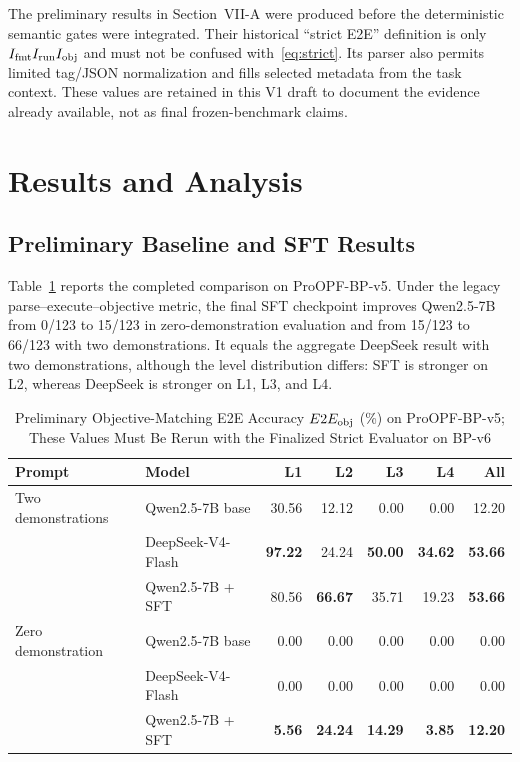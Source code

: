 \documentclass[lettersize,journal]{IEEEtran}
\begin{document}
The preliminary results in Section~VII-A were produced before the deterministic semantic gates were integrated. Their historical ``strict E2E'' definition is only $I_{\rm fmt}I_{\rm run}I_{\rm obj}$ and must not be confused with~\eqref{eq:strict}. Its parser also permits limited tag/JSON normalization and fills selected metadata from the task context. These values are retained in this V1 draft to document the evidence already available, not as final frozen-benchmark claims.

\section{Results and Analysis}
\subsection{Preliminary Baseline and SFT Results}
Table~\ref{tab:prelim-results} reports the completed comparison on ProOPF-BP-v5. Under the legacy parse--execute--objective metric, the final SFT checkpoint improves Qwen2.5-7B from 0/123 to 15/123 in zero-demonstration evaluation and from 15/123 to 66/123 with two demonstrations. It equals the aggregate DeepSeek result with two demonstrations, although the level distribution differs: SFT is stronger on L2, whereas DeepSeek is stronger on L1, L3, and L4.

\begin{table}[!t]
\caption{Preliminary Objective-Matching E2E Accuracy $E2E_{\rm obj}$ (\%) on ProOPF-BP-v5; These Values Must Be Rerun with the Finalized Strict Evaluator on BP-v6}
\label{tab:prelim-results}
\centering
\footnotesize
\begin{tabular}{@{}llrrrrr@{}}
\toprule
Prompt & Model & L1 & L2 & L3 & L4 & All \\
\midrule
Two demonstrations & Qwen2.5-7B base & 30.56 & 12.12 & 0.00 & 0.00 & 12.20 \\
& DeepSeek-V4-Flash & \textbf{97.22} & 24.24 & \textbf{50.00} & \textbf{34.62} & \textbf{53.66} \\
& Qwen2.5-7B + SFT & 80.56 & \textbf{66.67} & 35.71 & 19.23 & \textbf{53.66} \\
\midrule
Zero demonstration & Qwen2.5-7B base & 0.00 & 0.00 & 0.00 & 0.00 & 0.00 \\
& DeepSeek-V4-Flash & 0.00 & 0.00 & 0.00 & 0.00 & 0.00 \\
& Qwen2.5-7B + SFT & \textbf{5.56} & \textbf{24.24} & \textbf{14.29} & \textbf{3.85} & \textbf{12.20} \\
\bottomrule
\end{tabular}
\end{table}
\end{document}
